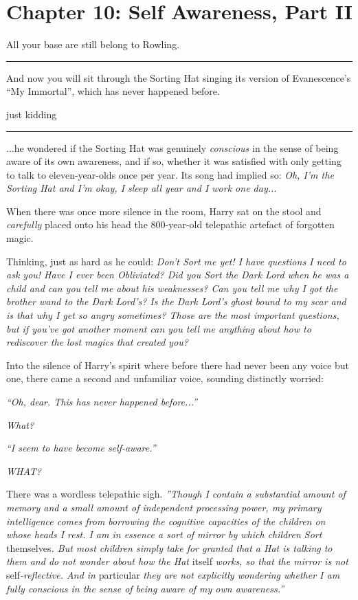 \chapter{Chapter 10: Self Awareness, Part II}
All your base are still belong to Rowling.

\begin{center}\rule{3in}{0.4pt}\end{center}

And now you will sit through the Sorting Hat singing its version of
Evanescence's ``My Immortal'', which has never happened before.

just kidding

\begin{center}\rule{3in}{0.4pt}\end{center}

...he wondered if the Sorting Hat was genuinely \emph{conscious} in
the sense of being aware of its own awareness, and if so, whether it was
satisfied with only getting to talk to eleven-year-olds once per year.
Its song had implied so: \emph{Oh, I'm the Sorting Hat and I'm okay, I
sleep all year and I work one day...}

When there was once more silence in the room, Harry sat on the stool and
\emph{carefully} placed onto his head the 800-year-old telepathic
artefact of forgotten magic.

Thinking, just as hard as he could: \emph{Don't Sort me yet! I have
questions I need to ask you! Have I ever been Obliviated? Did you Sort
the Dark Lord when he was a child and can you tell me about his
weaknesses? Can you tell me why I got the brother wand to the Dark
Lord's? Is the Dark Lord's ghost bound to my scar and is that why I get
so angry sometimes? Those are the most important questions, but if
you've got another moment can you tell me anything about how to
rediscover the lost magics that created you?}

Into the silence of Harry's spirit where before there had never been any
voice but one, there came a second and unfamiliar voice, sounding
distinctly worried:

\emph{``Oh, dear. This has never happened before...''}

\emph{What?}

\emph{``I seem to have become self-aware.''}

\emph{WHAT?}

There was a wordless telepathic sigh. \emph{''Though I contain a
substantial amount of memory and a small amount of independent
processing power, my primary intelligence comes from borrowing the
cognitive capacities of the children on whose heads I rest. I am in
essence a sort of mirror by which children Sort} themselves\emph{. But
most children simply take for granted that a Hat is talking to them and
do not wonder about how the Hat} itself \emph{works, so that the mirror
is not} self\emph{-reflective. And in} particular \emph{they are not
explicitly wondering whether I am fully conscious in the sense of being
aware of my own awareness.''}

